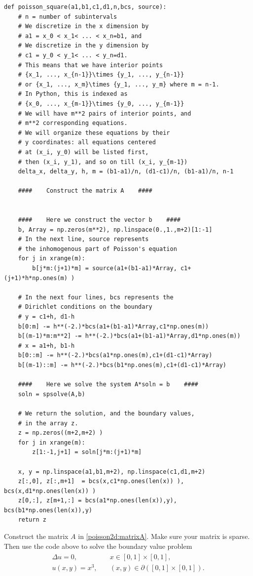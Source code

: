 \begin{lstlisting}
def poisson_square(a1,b1,c1,d1,n,bcs, source): 
	# n = number of subintervals
	# We discretize in the x dimension by 
	# a1 = x_0 < x_1< ... < x_n=b1, and 
	# We discretize in the y dimension by 
	# c1 = y_0 < y_1< ... < y_n=d1. 
	# This means that we have interior points 
	# {x_1, ..., x_{n-1}}\times {y_1, ..., y_{n-1}}
	# or {x_1, ..., x_m}\times {y_1, ..., y_m} where m = n-1. 
	# In Python, this is indexed as 
	# {x_0, ..., x_{m-1}}\times {y_0, ..., y_{m-1}}
	# We will have m**2 pairs of interior points, and 
	# m**2 corresponding equations.
	# We will organize these equations by their 
	# y coordinates: all equations centered 
	# at (x_i, y_0) will be listed first, 
	# then (x_i, y_1), and so on till (x_i, y_{m-1})
	delta_x, delta_y, h, m = (b1-a1)/n, (d1-c1)/n, (b1-a1)/n, n-1
	
	####    Construct the matrix A    ####
	
	
	####    Here we construct the vector b    ####
	b, Array = np.zeros(m**2), np.linspace(0.,1.,m+2)[1:-1]
	# In the next line, source represents 
	# the inhomogenous part of Poisson's equation
	for j in xrange(m): 
		b[j*m:(j+1)*m] = source(a1+(b1-a1)*Array, c1+(j+1)*h*np.ones(m) )
	
    # In the next four lines, bcs represents the 
	# Dirichlet conditions on the boundary
	# y = c1+h, d1-h
	b[0:m] -= h**(-2.)*bcs(a1+(b1-a1)*Array,c1*np.ones(m))
	b[(m-1)*m:m**2] -= h**(-2.)*bcs(a1+(b1-a1)*Array,d1*np.ones(m))
	# x = a1+h, b1-h
	b[0::m] -= h**(-2.)*bcs(a1*np.ones(m),c1+(d1-c1)*Array) 
	b[(m-1)::m] -= h**(-2.)*bcs(b1*np.ones(m),c1+(d1-c1)*Array)
	
    ####    Here we solve the system A*soln = b    ####
	soln = spsolve(A,b) 
	
	# We return the solution, and the boundary values, 
	# in the array z.
	z = np.zeros((m+2,m+2) ) 
	for j in xrange(m): 
		z[1:-1,j+1] = soln[j*m:(j+1)*m]
	
	x, y = np.linspace(a1,b1,m+2), np.linspace(c1,d1,m+2)
	z[:,0], z[:,m+1]  = bcs(x,c1*np.ones(len(x)) ), bcs(x,d1*np.ones(len(x)) )
	z[0,:], z[m+1,:] = bcs(a1*np.ones(len(x)),y), bcs(b1*np.ones(len(x)),y)
	return z

\end{lstlisting}

\begin{problem}
Construct the matrix $A$ in \eqref{poisson2d:matrixA}. Make sure your matrix is sparse. Then use the code 
above to solve the boundary value problem
\begin{align}
	\begin{split}
	\Delta u = 0, &{}\quad x \in [0,1]\times [0,1],\\
	u(x,y) = x^3, &{}\quad (x,y) \in \partial ([0,1]\times [0,1]).
	\end{split}
	\label{poisson2d:laplace}
\end{align}
\end{problem}

